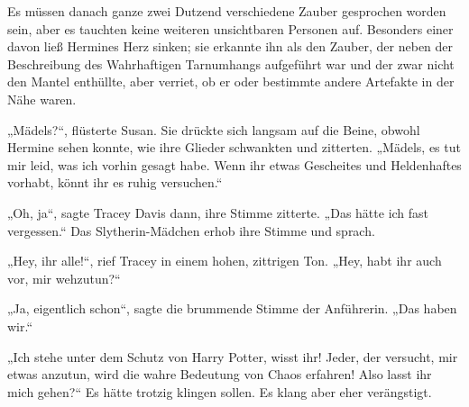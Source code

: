 Es müssen danach ganze zwei Dutzend verschiedene Zauber gesprochen worden sein, aber es tauchten keine weiteren unsichtbaren Personen auf. Besonders einer davon ließ Hermines Herz sinken; sie erkannte ihn als den Zauber, der neben der Beschreibung des Wahrhaftigen Tarnumhangs aufgeführt war und der zwar nicht den Mantel enthüllte, aber verriet, ob er oder bestimmte andere Artefakte in der Nähe waren.

„Mädels?“, flüsterte Susan. Sie drückte sich langsam auf die Beine, obwohl Hermine sehen konnte, wie ihre Glieder schwankten und zitterten. „Mädels, es tut mir leid, was ich vorhin gesagt habe. Wenn ihr etwas Gescheites und Heldenhaftes vorhabt, könnt ihr es ruhig versuchen.“

„Oh, ja“, sagte Tracey Davis dann, ihre Stimme zitterte. „Das hätte ich fast vergessen.“ Das Slytherin-Mädchen erhob ihre Stimme und sprach.

„Hey, ihr alle!“, rief Tracey in einem hohen, zittrigen Ton. „Hey, habt ihr auch vor, mir wehzutun?“

„Ja, eigentlich schon“, sagte die brummende Stimme der Anführerin. „Das haben wir.“

„Ich stehe unter dem Schutz von Harry Potter, wisst ihr! Jeder, der versucht, mir etwas anzutun, wird die wahre Bedeutung von Chaos erfahren! Also lasst ihr mich gehen?“ Es hätte trotzig klingen sollen. Es klang aber eher verängstigt.

